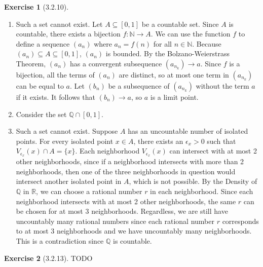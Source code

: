 \documentclass{amsart}
\theoremstyle{definition}
\newtheorem{exercise}{Exercise}
\newcommand{\N}{\mathbb{N}}
\newcommand{\Q}{\mathbb{Q}}
\newcommand{\R}{\mathbb{R}}
\begin{document}
\begin{exercise}[3.2.10]
  \begin{enumerate}[label={(\roman*)}]
    \item Such a set cannot exist. Let $A \subseteq [0, 1]$ be a countable set.
      Since $A$ is countable, there exists a bijection $f : \N \to A$. We can
      use the function $f$ to define a sequence $(a_n)$ where $a_n = f(n)$ for
      all $n \in \N$. Because $(a_n) \subseteq A \subseteq [0, 1]$, $(a_n)$ is
      bounded. By the Bolzano-Weierstrass Theorem, $(a_n)$ has a convergent
      subsequence $(a_{n_k}) \to a$. Since $f$ is a bijection, all the terms of
      $(a_n)$ are distinct, so at most one term in $(a_{n_k})$ can be equal to
      $a$. Let $(b_n)$ be a subsequence of $(a_{n_k})$ without the term $a$ if
      it exists. It follows that $(b_n) \to a$, so $a$ is a limit point.
    \item Consider the set $\Q \cap [0, 1]$.
    \item Such a set cannot exist. Suppose $A$ has an uncountable number of
      isolated points. For every isolated point $x \in A$, there exists
      an $\epsilon_x > 0$ such that $V_{\epsilon_x}(x) \cap A = \{x\}$. Each
      neighborhood $V_{\epsilon_x}(x)$ can intersect with at most 2 other
      neighborhoods, since if a neighborhood intersects with more than 2
      neighborhoods, then one of the three neighborhoods in question  would
      intersect another isolated point in $A$, which is not possible. By the
      Density of $\Q$ in $\R$, we can choose a rational number $r$ in each
      neighborhood. Since each neighborhood intersects with at most 2 other
      neighborhoods, the same $r$ can be chosen for at most 3 neighborhoods.
      Regardless, we are still have uncountably many rational numbers since each
      rational number $r$ corresponds to at most 3 neighborhoods and we have
      uncountably many neighborhoods. This is a contradiction since $\Q$ is
      countable.
  \end{enumerate}
\end{exercise}

\begin{exercise}[3.2.13]
  TODO
\end{exercise}
\end{document}

